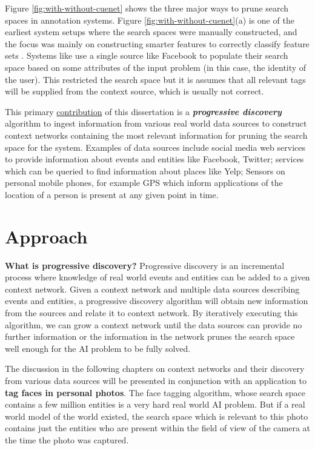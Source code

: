 Figure \ref{fig:with-without-cuenet} shows the three major ways to prune search spaces in annotation systems. Figure \ref{fig:with-without-cuenet}(a) is one of the earliest system setups where the search spaces were manually constructed, and the focus was mainly on constructing smarter features to correctly classify feature sets \cite{turk1991eigenfaces, belhumeur1997eigenfaces}. Systems like \cite{stone2008autotagging} use a single source like Facebook to populate their search space based on some attributes of the input problem (in this case, the identity of the user). This restricted the search space but it is assumes that all relevant tags will be supplied from the context source, which is usually not correct.

This primary \uline{contribution} of this dissertation is a \textbf{\textit{progressive discovery}} algorithm to ingest information from various real world data sources to construct context networks containing the most relevant information for pruning the search space for the system. Examples of data sources include social media web services to provide information about events and entities like Facebook, Twitter; services which can be queried to find information about places like Yelp; Sensors on personal mobile phones, for example GPS which inform applications of the location of a person is present at any given point in time.

\section{Approach}

\textbf{What is progressive discovery?} Progressive discovery is an incremental process where knowledge of real world events and entities can be added to a given context network. Given a context network and multiple data sources describing events and entities, a progressive discovery algorithm will obtain new information from the sources and relate it to context network. By iteratively executing this algorithm, we can grow a context network until the data sources can provide no further information or the information in the network prunes the search space well enough for the AI problem to be fully solved.

The discussion in the following chapters on context networks and their discovery from various data sources will be presented in conjunction with an application to \textbf{tag faces in personal photos}. The face tagging algorithm, whose search space contains a few million entities is a very hard real world AI problem. But if a real world model of the world existed, the search space which is relevant to this photo contains just the entities who are present within the field of view of the camera at the time the photo was captured. 

